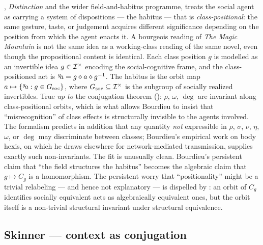 \begin{zooentry*}
, \emph{Distinction} \cite{Bourdieu1984} and
the wider field-and-habitus programme, treats the social agent as
carrying a system of dispositions --- the habitus --- that is
\emph{class-positional}: the same gesture, taste, or judgement
acquires different significance depending on the position from which
the agent enacts it. A bourgeois reading of \emph{The Magic Mountain}
is not the same idea as a working-class reading of the same novel,
even though the propositional content is identical.
\formalclaim Each class position $g$ is modelled as an invertible idea
$g\in\mathcal{I}^{\times}$ encoding the social-cognitive frame, and the
class-positioned act is ${}^{g}\!a = g\mathbin{\diamond} a\mathbin{\diamond} g^{-1}$.
The habitus is the orbit map $a\mapsto \{{}^{g}\!a : g\in
G_{\mathrm{soc}}\}$, where $G_{\mathrm{soc}}\subseteq\mathcal{I}^{\times}$
is the subgroup of socially realized invertibles.
\formalstatus
True \emph{up to} the conjugation theorem ():
$\rho$, $\omega$, $\deg$ are invariant along class-positional orbits,
which is what allows Bourdieu to insist that ``misrecognition'' of
class effects is structurally invisible to the agents involved. The
formalism predicts in addition that any quantity \emph{not} expressible
in $\rho$, $\sigma$, $\nu$, $\eta$, $\omega$, or $\deg$ may
discriminate between classes; Bourdieu's empirical work on body
hexis, on which he draws elsewhere \cite{Granovetter1973} for
network-mediated transmission, supplies exactly such non-invariants.
\litcomment
The fit is unusually clean. Bourdieu's persistent claim that ``the
field structures the habitus'' becomes the algebraic claim that
$g\mapsto C_g$ is a homomorphism. The persistent worry that
``positionality'' might be a trivial relabeling --- and hence not
explanatory --- is dispelled by : an orbit of
$C_g$ identifies socially equivalent acts as algebraically equivalent
ones, but the orbit itself is a non-trivial structural invariant
under structural equivalence.
\end{zooentry*}

\subsection{Skinner --- context as conjugation}\label{zoo:skinner}

